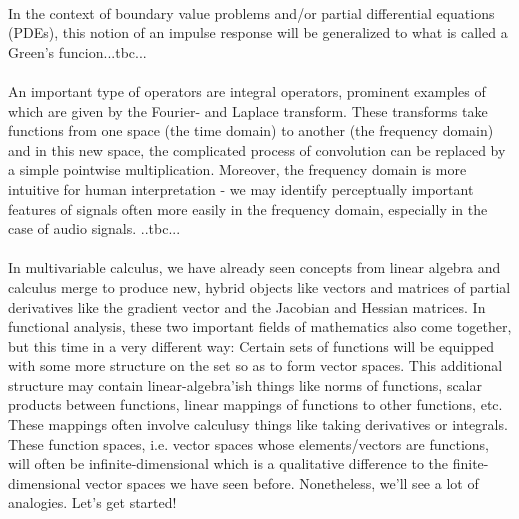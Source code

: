 \paragraph{}
In the context of boundary value problems and/or partial differential equations (PDEs), this notion of an impulse response will be generalized to what is called a Green's funcion...tbc...

\paragraph{}
An important type of operators are integral operators, prominent examples of which are given by the Fourier- and Laplace transform. These transforms take functions from one space (the time domain) to another (the frequency domain) and in this new space, the complicated process of convolution can be replaced by a simple pointwise multiplication. Moreover, the frequency domain is more intuitive for human interpretation - we may identify perceptually important features of signals often more easily in the frequency domain, especially in the case of audio signals.
..tbc...

\paragraph{}
In multivariable calculus, we have already seen concepts from linear algebra and calculus merge to produce new, hybrid objects like vectors and matrices of partial derivatives like the gradient vector and the Jacobian and Hessian matrices. In functional analysis, these two important fields of mathematics also come together, but this time in a very different way: Certain sets of functions will be equipped with some more structure on the set so as to form vector spaces. This additional structure may contain linear-algebra'ish things like norms of functions, scalar products between functions, linear mappings of functions to other functions, etc. These mappings often involve calculusy things like taking derivatives or integrals. These function spaces, i.e. vector spaces whose elements/vectors are functions, will often be infinite-dimensional which is a qualitative difference to the finite-dimensional vector spaces we have seen before. Nonetheless, we'll see a lot of analogies. Let's get started!

\begin{comment}


-integral transforms (fourier- and laplace trafo)
-greens-functions
-calculus of variations
-operators: eigenvalues, eigenfunctions


\end{comment}